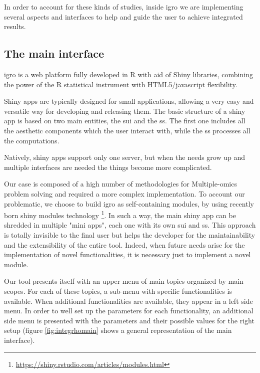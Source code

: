 In order to account for these kinds of studies, inside \gls{igro} we are implementing several aspects and interfaces to help and guide the user to achieve integrated results.

\subsection{The main interface}
\gls{igro} is a web platform fully developed in R with aid of Shiny libraries, combining the power of the R statistical instrument with HTML5/javascript flexibility.

Shiny apps are typically designed for small applications, allowing a very easy and versatile way for developing and releasing them.
The basic structure of a shiny app is based on two main entities, the \gls{sui} and the \gls{ss}.
The first one includes all the aesthetic components which the user interact with, while the \gls{ss} processes all the computations.

Natively, shiny apps support only one server, but when the needs grow up and multiple interfaces are needed the things become more complicated. 

Our case is composed of a high number of methodologies for Multiple-omics problem solving and required a more complex implementation.
To account our problematic, we choose to build \gls{igro} as self-containing modules, by using recently born shiny modules technology \footnote{\url{https://shiny.rstudio.com/articles/modules.html}}.
In such a way, the main shiny app can be shredded in multiple "mini apps", each one with its own \gls{sui} and \gls{ss}.
This approach is totally invisible to the final user but helps the developer for the maintainability and the extensibility of the entire tool.
Indeed, when future needs arise for the implementation of novel functionalities, it is necessary just to implement a novel module.

Our tool presents itself with an upper menu of main topics organized by main scopes. 
For each of these topics, a sub-menu with specific functionalities is available.
When additional functionalities are available, they appear in a left side menu.
In order to well set up the parameters for each functionality, an additional side menu is presented with the parameters and their possible values for the right setup (figure \ref{fig:integrhomain} shows a general representation of the main interface).

